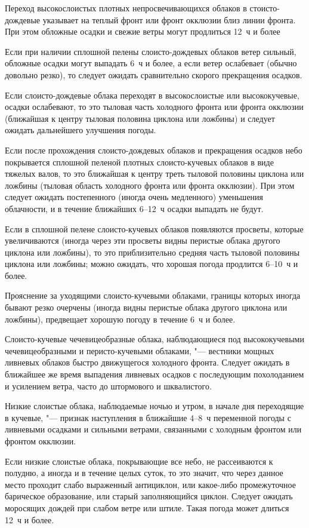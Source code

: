  Переход высокослоистых плотных непросвечивающихся облаков в
стоисто-дождевые указывает на теплый фронт или фронт окклюзии близ
линии фронта. При этом обложные осадки и свежие ветры могут продлиться
12~ч и более

 Если при наличии сплошной пелены слоисто-дождевых облаков ветер
сильный, обложные осадки могут выпадать 6~ч и более, а если ветер
ослабевает (обычно довольно резко), то следует ожидать сравнительно
скорого прекращения осадков.

 Если слоисто-дождевые облака переходят в высокослоистые или
высококучевые, осадки ослабевают, то это тыловая часть холодного
фронта или фронта окклюзии (ближайшая к центру тыловая половина
циклона или ложбины) и следует ожидать дальнейшего улучшения погоды.

 Если после прохождения слоисто-дождевых облаков и прекращения
осадков небо покрывается сплошной пеленой плотных слоисто-кучевых
облаков в виде тяжелых валов, то это ближайшая к центру треть тыловой
половины циклона или ложбины (тыловая область холодного фронта или
фронта окклюзии). При этом следует ожидать постепенного (иногда очень
медленного) уменьшения облачности, и в течение ближайших 6--12~ч
осадки выпадать не будут.

 Если в сплошной пелене слоисто-кучевых облаков появляются
просветы, которые увеличиваются (иногда через эти просветы видны
перистые облака другого циклона или ложбины), то это приблизительно
средняя часть тыловой половины циклона или ложбины; можно ожидать, что
хорошая погода продлится 6--10~ч и более.

 Прояснение за уходящими слоисто-кучевыми облаками, границы
которых иногда бывают резко очерчены (иногда видны перистые облака
другого циклона или ложбины), предвещает хорошую погоду в течение 6~ч
и более.

 Слоисто-кучевые чечевицеобразные облака, наблюдающиеся под
высококучевыми чечевицеобразными и перисто-кучевыми облаками, "---
вестники мощных ливневых облаков быстро движущегося холодного
фронта. Следует ожидать в ближайшее же время выпадения ливневых осадков
с последующим похолоданием и усилением ветра, часто до штормового и
шквалистого.

 Низкие слоистые облака, наблюдаемые ночью и утром, в начале дня
переходящие в кучевые, "--- признак наступления в ближайшие 4--8~ч
переменной погоды с ливневыми осадками и сильными ветрами, связанными
с холодным фронтом или фронтом окклюзии.

 Если низкие слоистые облака, покрывающие все небо, не
рассеиваются к полудню, а иногда и в течение целых суток, то это
значит, что через данное место проходит слабо выраженный антициклон,
или какое-либо промежуточное барическое образование, или старый
заполняющийся циклон. Следует ожидать моросящих дождей при слабом
ветре или штиле. Такая погода может длиться 12~ч и более.

